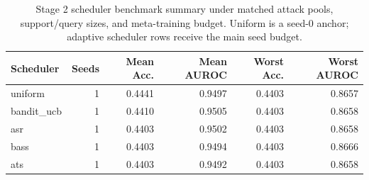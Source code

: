 \begin{table}[t]
\centering
\small
\begin{tabular}{lrrrrr}
\toprule
Scheduler & Seeds & Mean Acc. & Mean AUROC & Worst Acc. & Worst AUROC \\
\midrule
uniform & 1 & 0.4441 & 0.9497 & 0.4403 & 0.8657 \\
bandit\_ucb & 1 & 0.4410 & 0.9505 & 0.4403 & 0.8658 \\
asr & 1 & 0.4403 & 0.9502 & 0.4403 & 0.8658 \\
bass & 1 & 0.4403 & 0.9494 & 0.4403 & 0.8666 \\
ats & 1 & 0.4403 & 0.9492 & 0.4403 & 0.8658 \\
\bottomrule
\end{tabular}
\caption{Stage 2 scheduler benchmark summary under matched attack pools, support/query sizes, and meta-training budget. Uniform is a seed-0 anchor; adaptive scheduler rows receive the main seed budget.}
\label{tab:stage2_scheduler_summary}
\end{table}
